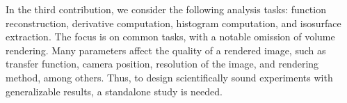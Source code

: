 In the third contribution, we consider the following analysis tasks: function reconstruction,
derivative computation, histogram computation, and isosurface extraction. The focus is on common
tasks, with a notable omission of volume rendering. Many parameters affect the quality of a rendered
image, such as transfer function, camera position, resolution of the image, and rendering method,
among others. Thus, to design scientifically sound experiments with generalizable results, a
standalone study is needed.

